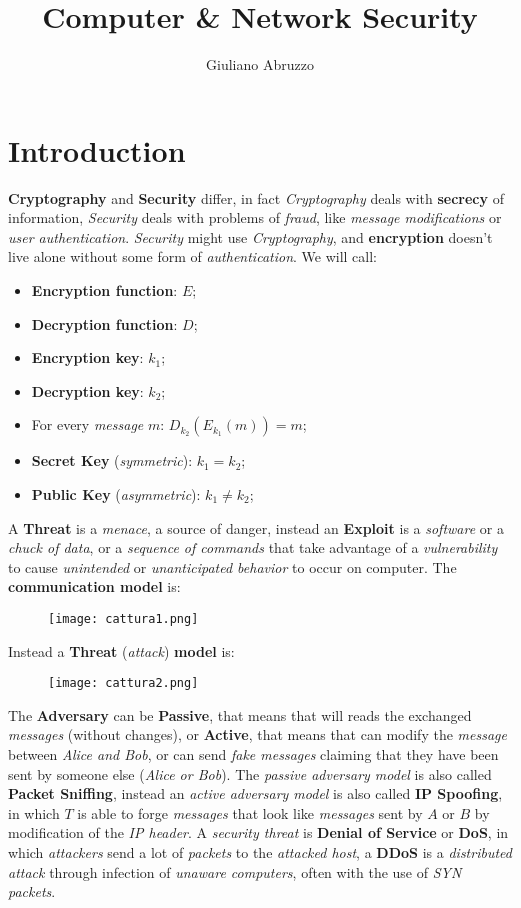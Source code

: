 \documentclass{article}
\author{Giuliano Abruzzo}
\title{Computer \& Network Security}
\begin{document}
\maketitle
\newpage
\tableofcontents
\newpage
\section{Introduction}
\textbf{Cryptography} and \textbf{Security} differ, in fact \emph{Cryptography} deals with \textbf{secrecy} of information, \emph{Security} deals with problems of \emph{fraud}, like \emph{message modifications} or \emph{user authentication}. \emph{Security} might use \emph{Cryptography}, and \textbf{encryption} doesn't live alone without some form of \emph{authentication}. We will call:
\begin{itemize}
\item \textbf{Encryption function}: $E$;
\item \textbf{Decryption function}: $D$;
\item \textbf{Encryption key}: $k_1$;
\item \textbf{Decryption key}: $k_2$;
\item For every \emph{message} $m$: $D_{k_2}(E_{k_1}(m))=m$;
\item \textbf{Secret Key} (\emph{symmetric}): $k_1 = k_2$;
\item\textbf{Public Key} (\emph{asymmetric}): $k_1 \neq k_2$;
\end{itemize}
A \textbf{Threat} is a \emph{menace}, a source of danger, instead an \textbf{Exploit} is a \emph{software} or a \emph{chuck of data}, or a \emph{sequence of commands} that take advantage of a \emph{vulnerability} to cause \emph{unintended} or \emph{unanticipated behavior} to occur on computer. The \textbf{communication model} is:
\begin{figure}[H]
  \centering
  \texttt{[image: cattura1.png]}
\end{figure}
Instead a \textbf{Threat} (\emph{attack}) \textbf{model} is:
\begin{figure}[H]
  \centering
  \texttt{[image: cattura2.png]}
\end{figure}
The \textbf{Adversary} can be \textbf{Passive}, that means that will reads the exchanged \emph{messages} (without changes), or \textbf{Active}, that means that can modify the \emph{message} between \emph{Alice and Bob}, or can send \emph{fake messages} claiming that they have been sent by someone else (\emph{Alice or Bob}). The \emph{passive adversary model} is also called \textbf{Packet Sniffing}, instead an \emph{active adversary model} is also called \textbf{IP Spoofing}, in which $T$ is able to forge \emph{messages} that look like \emph{messages} sent by $A$ or $B$ by modification of the\emph{ IP header}. A \emph{security threat} is \textbf{Denial of Service} or \textbf{DoS}, in which \emph{attackers} send a lot of \emph{packets} to the \emph{attacked host}, a \textbf{DDoS} is a \emph{distributed attack} through infection of \emph{unaware computers}, often with the use of \emph{SYN packets}. \\\\
\end{document}
